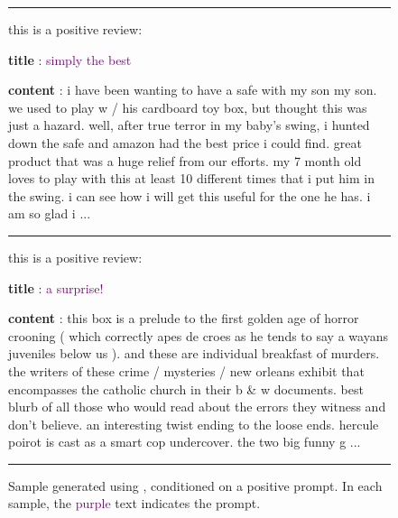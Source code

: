 \begin{figure*}[t]
\begin{minipage}{0.9\textwidth}
\vspace{0.5em}
\hrule
\vspace{0.5em}

this is a positive review:


\textbf{title} : \textcolor{purple}{simply the best}

\textbf{content} : i have been wanting to have a safe with my son my son. we used to play w / his cardboard toy box, but thought this was just a hazard. well, after true terror in my baby's swing, i hunted down the safe and amazon had the best price i could find. great product that was a huge relief from our efforts. my 7 month old loves to play with this at least 10 different times that i put him in the swing. i can see how i will get this useful for the one he has. i am so glad i ...



\vspace{0.5em}
\hrule
\vspace{0.5em}

this is a positive review:

\textbf{title} : \textcolor{purple}{a surprise!}

\textbf{content} : this box is a prelude to the first golden age of horror crooning ( which correctly apes de croes as he tends to say a wayans juveniles below us ). and these are individual breakfast of murders. the writers of these crime / mysteries / new orleans exhibit that encompasses the catholic church in their b \& w documents. best blurb of all those who would read about the errors they witness and don't believe. an interesting twist ending to the loose ends. hercule poirot is cast as a smart cop undercover. the two big funny g ...


\vspace{0.5em}
\hrule height 0.8pt
\end{minipage}
\caption{Sample generated using \method{}, conditioned on a positive prompt. In each sample, the \textcolor{purple}{purple} text indicates the prompt.}
\label{fig:amazon_result_positive}
\end{figure*}



